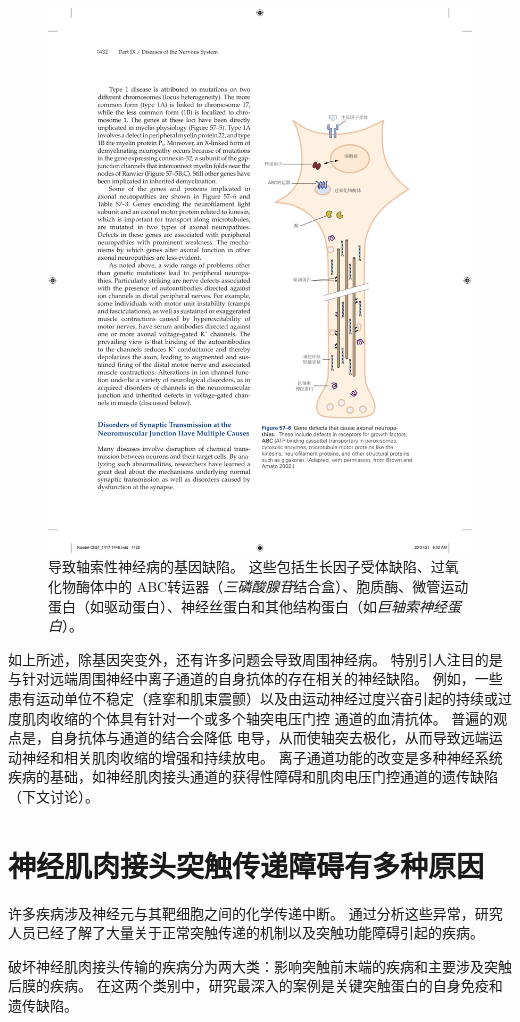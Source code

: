 \begin{figure}[htbp]
	\centering
	\includegraphics[width=0.55\linewidth]{chap57/fig_57_6}
	\caption{导致轴索性神经病的基因缺陷。
		这些包括生长因子受体缺陷、过氧化物酶体中的 ABC转运器（\textit{三磷酸腺苷}结合盒）、胞质酶、微管运动蛋白（如驱动蛋白）、神经丝蛋白和其他结构蛋白（如\textit{巨轴索神经蛋白}）\cite{brown2002inherited}。}
	\label{fig:57_6}
\end{figure}


如上所述，除基因突变外，还有许多问题会导致周围神经病。
特别引人注目的是与针对远端周围神经中离子通道的自身抗体的存在相关的神经缺陷。
例如，一些患有运动单位不稳定（痉挛和肌束震颤）以及由运动神经过度兴奋引起的持续或过度肌肉收缩的个体具有针对一个或多个轴突电压门控  通道的血清抗体。
普遍的观点是，自身抗体与通道的结合会降低  电导，从而使轴突去极化，从而导致远端运动神经和相关肌肉收缩的增强和持续放电。
离子通道功能的改变是多种神经系统疾病的基础，如神经肌肉接头通道的获得性障碍和肌肉电压门控通道的遗传缺陷（下文讨论）。



\section{神经肌肉接头突触传递障碍有多种原因}

许多疾病涉及神经元与其靶细胞之间的化学传递中断。
通过分析这些异常，研究人员已经了解了大量关于正常突触传递的机制以及突触功能障碍引起的疾病。


破坏神经肌肉接头传输的疾病分为两大类：影响突触前末端的疾病和主要涉及突触后膜的疾病。
在这两个类别中，研究最深入的案例是关键突触蛋白的自身免疫和遗传缺陷。



